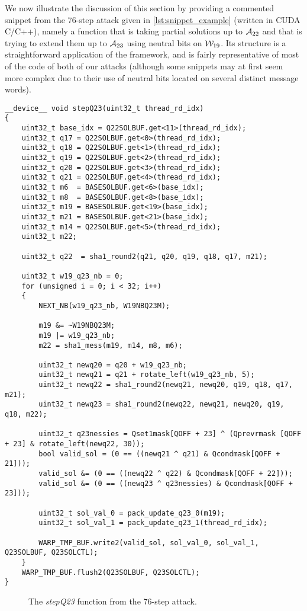 We now illustrate the discussion of this section by providing a commented snippet from the 76-step attack given in \autoref{lst:snippet_example} (written in \textsf{CUDA C/C++}), namely a function that is taking partial solutions up to $\mathcal{A}_{22}$  and that is
trying to extend them up to $\mathcal{A}_{23}$ using neutral bits on $\mathcal{W}_{19}$. Its structure is a straightforward application of the framework, and is fairly representative of most of the
code of both of our attacks (although some snippets may at first seem more complex due to their use of neutral bits located on several distinct message words).

\begin{verbatim}
__device__ void stepQ23(uint32_t thread_rd_idx)
{
	uint32_t base_idx = Q22SOLBUF.get<11>(thread_rd_idx);
	uint32_t q17 = Q22SOLBUF.get<0>(thread_rd_idx);
	uint32_t q18 = Q22SOLBUF.get<1>(thread_rd_idx);
	uint32_t q19 = Q22SOLBUF.get<2>(thread_rd_idx);
	uint32_t q20 = Q22SOLBUF.get<3>(thread_rd_idx);
	uint32_t q21 = Q22SOLBUF.get<4>(thread_rd_idx);
	uint32_t m6  = BASESOLBUF.get<6>(base_idx);
	uint32_t m8  = BASESOLBUF.get<8>(base_idx);
	uint32_t m19 = BASESOLBUF.get<19>(base_idx);
	uint32_t m21 = BASESOLBUF.get<21>(base_idx);
	uint32_t m14 = Q22SOLBUF.get<5>(thread_rd_idx);
	uint32_t m22;

	uint32_t q22  = sha1_round2(q21, q20, q19, q18, q17, m21);

	uint32_t w19_q23_nb = 0;
	for (unsigned i = 0; i < 32; i++)
	{
		NEXT_NB(w19_q23_nb, W19NBQ23M);

		m19 &= ~W19NBQ23M;
		m19 |= w19_q23_nb;
		m22 = sha1_mess(m19, m14, m8, m6);

		uint32_t newq20 = q20 + w19_q23_nb;
		uint32_t newq21 = q21 + rotate_left(w19_q23_nb, 5);
		uint32_t newq22 = sha1_round2(newq21, newq20, q19, q18, q17, m21);
		uint32_t newq23 = sha1_round2(newq22, newq21, newq20, q19, q18, m22);

		uint32_t q23nessies = Qset1mask[QOFF + 23] ^ (Qprevrmask [QOFF + 23] & rotate_left(newq22, 30));
		bool valid_sol = (0 == ((newq21 ^ q21) & Qcondmask[QOFF + 21]));
		valid_sol &= (0 == ((newq22 ^ q22) & Qcondmask[QOFF + 22]));
		valid_sol &= (0 == ((newq23 ^ q23nessies) & Qcondmask[QOFF + 23]));

		uint32_t sol_val_0 = pack_update_q23_0(m19);
		uint32_t sol_val_1 = pack_update_q23_1(thread_rd_idx);

		WARP_TMP_BUF.write2(valid_sol, sol_val_0, sol_val_1, Q23SOLBUF, Q23SOLCTL);
	}
	WARP_TMP_BUF.flush2(Q23SOLBUF, Q23SOLCTL);
}
\end{verbatim}
\begin{figure}[tbh]
\caption{The \emph{stepQ23} function from the 76-step attack.}
\label{lst:snippet_example}
\end{figure}

